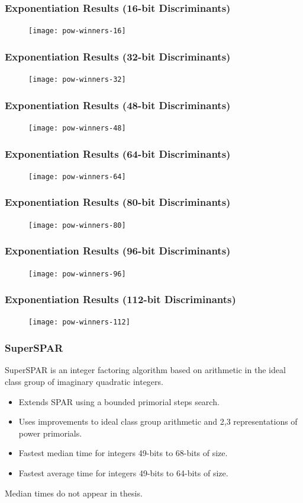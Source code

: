 \documentclass{beamer}
\newcommand{\smallfont}{\fontsize{6pt}{7.2}\selectfont}
\begin{document}
\begin{frame}
\frametitle{Exponentiation Results (16-bit Discriminants)}
\begin{figure}
\texttt{[image: pow-winners-16]}
\end{figure}
\end{frame}
\begin{frame}
\frametitle{Exponentiation Results (32-bit Discriminants)}
\begin{figure}
\texttt{[image: pow-winners-32]}
\end{figure}
\end{frame}
\begin{frame}
\frametitle{Exponentiation Results (48-bit Discriminants)}
\begin{figure}
\texttt{[image: pow-winners-48]}
\end{figure}
\end{frame}
\begin{frame}
\frametitle{Exponentiation Results (64-bit Discriminants)}
\begin{figure}
\texttt{[image: pow-winners-64]}
\end{figure}
\end{frame}
\begin{frame}
\frametitle{Exponentiation Results (80-bit Discriminants)}
\begin{figure}
\texttt{[image: pow-winners-80]}
\end{figure}
\end{frame}
\begin{frame}
\frametitle{Exponentiation Results (96-bit Discriminants)}
\begin{figure}
\texttt{[image: pow-winners-96]}
\end{figure}
\end{frame}
\begin{frame}
\frametitle{Exponentiation Results (112-bit Discriminants)}
\begin{figure}
\texttt{[image: pow-winners-112]}
\end{figure}
\end{frame}



\begin{frame}
\frametitle{SuperSPAR}
SuperSPAR is an integer factoring algorithm based on arithmetic in the ideal class group of imaginary quadratic integers.
\begin{itemize}
\item Extends SPAR using a bounded primorial steps search.
\item Uses improvements to ideal class group arithmetic and 2,3 representations of power primorials.
\item Fastest median time for integers 49-bits to 68-bits of size.
\item Fastest average time for integers 49-bits to 64-bits of size.
\end{itemize}
\bigbreak
\smallfont
Median times do not appear in thesis.
\end{frame}
\end{document}
